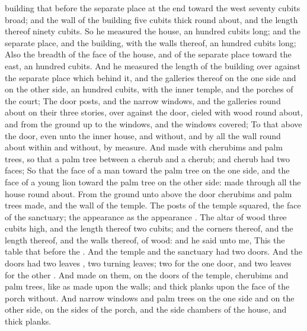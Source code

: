 {building that
{}
before the separate
place at the
end
toward the
west
{}
seventy
cubits
broad; and the
wall of the
building
{}
five
cubits
thick round
about, and the
length thereof
ninety
cubits.
So he
measured the
house, an
hundred
cubits
long; and the separate
place, and the
building, with the
walls thereof, an
hundred
cubits
long;
Also the
breadth of the
face of the
house, and of the separate
place toward the
east, an
hundred
cubits.
And he
measured the
length of the
building over
against the separate
place which
{}
behind it, and the
galleries thereof on the one side and on the other side, an
hundred
cubits, with the
inner
temple, and the
porches of the
court;
The door
posts, and the
narrow
windows, and the
galleries round
about on their three
stories, over
against the
door,
cieled with
wood round
about, and from the
ground up to the
windows, and the
windows
{}
covered;
To that above the
door, even unto the
inner
house, and
without, and by all the
wall round
about
within and
without, by
measure.
And
{}
made with
cherubims and palm
trees, so that a palm
tree
{} between a
cherub and a
cherub; and
{}
cherub had
two
faces;
So that the
face of a
man
{} toward the palm
tree on the one side, and the
face of a young
lion toward the palm
tree on the other side:
{}
made through all the
house round
about.
From the
ground unto above the
door
{}
cherubims and palm
trees
made, and
{} the
wall of the
temple.
The
posts of the
temple
{}
squared,
{} the
face of the
sanctuary; the
appearance
{} as the
appearance
{}.
The
altar of
wood
{}
three
cubits
high, and the
length thereof
two
cubits; and the
corners thereof, and the
length thereof, and the
walls thereof,
{} of
wood: and he
said unto me, This
{} the
table that
{}
before the
{}.
And the
temple and the
sanctuary had
two
doors.
And the
doors had
two
leaves
{},
two
turning
leaves;
two
{} for the
one
door, and
two
leaves for the
other
{}.
And
{}
made on them, on the
doors of the
temple,
cherubims and palm
trees, like as
{}
made upon the
walls; and
{}
thick
planks upon the
face of the
porch
without.
And
{}
narrow
windows and palm
trees on the one side and on the other side, on the
sides of the
porch, and
{} the side
chambers of the
house, and thick
planks.

}

